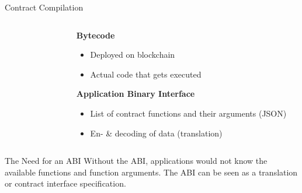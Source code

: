 \documentclass[]{beamer}
\begin{document}


\begin{frame}{Contract Compilation}

	\begin{columns}
		\begin{column}{0.6\textwidth}
			\begin{figure}[h!]
				\center
					
			\end{figure}\vspace{1em}
		\end{column}
		
		\begin{column}{0.5\textwidth}
			\textbf{Bytecode}
				\begin{itemize}
					\item Deployed on blockchain
					\item Actual code that gets executed
				\end{itemize}
		\vspace{1em}
			\textbf{Application Binary Interface}
				\begin{itemize}
					\item List of contract functions and their arguments (JSON)
					\item En- \& decoding of data (translation) 
				\end{itemize}
		\end{column}
	\end{columns}

	\begin{keytakeaway}{The Need for an ABI}
		 Without the ABI, applications would not know the available functions and function arguments. The ABI can be seen as a translation or contract interface specification.
	\end{keytakeaway}		

\end{frame}


\end{document}
